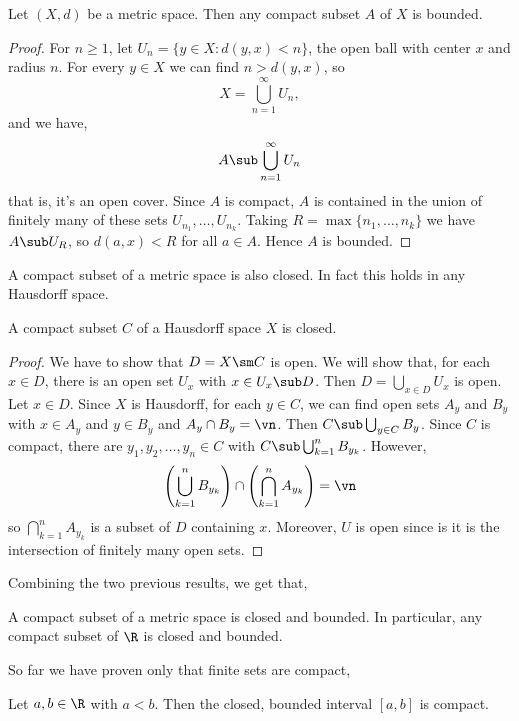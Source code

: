 \begin{nlemma}
  Let $(X, d)$ be a metric space. Then any compact subset $A$ of $X$ is bounded.
\end{nlemma}
\begin{proof}
  For $n \ge 1$, let $U_n = \{y \in X : d(y,x) < n\}$, the open ball with center $x$ and radius $n$. For every $y \in X$ we can find $n > d(y, x)$, so
  $$ X = \bigcup_{n=1}^\infty U_n, $$
  and we have,
  $$ A \sub \bigcup_{n=1}^\infty U_n $$
  that is, it's an open cover. Since $A$ is compact, $A$ is contained in the union of finitely many of these sets $U_{n_1}, \dots, U_{n_k}$. Taking $R = \max\{n_1, \dots, n_k\}$ we have $A \sub U_R$, so $d(a, x) < R$ for all $a \in A$. Hence $A$ is bounded.
\end{proof}

\noindent
A compact subset of a metric space is also closed. In fact this holds in any Hausdorff space.

\begin{nlemma}
  A compact subset $C$ of a Hausdorff space $X$ is closed.
\end{nlemma}
\begin{proof}
  We have to show that $D = X\sm C$ is open. We will show that, for each $x \in D$, there is an open set $U_x$ with $x \in U_x \sub D$. Then $D = \bigcup_{x \in D} U_x$ is open.\\

  \noindent
  Let $x \in D$. Since $X$ is Hausdorff, for each $y \in C$, we can find open sets $A_y$ and $B_y$ with $x \in A_y$ and $y \in B_y$ and $A_y \cap B_y = \vn$. Then $C \sub \bigcup_{y \in C} B_y$. Since $C$ is compact, there are $y_1, y_2, \dots, y_n \in C$ with $C \sub \bigcup_{k=1}^n B_{y_k}$. However,
  $$ \left( \bigcup_{k=1}^n B_{y_k} \right) \cap \left( \bigcap_{k=1}^n A_{y_k} \right) = \vn $$
  so $\bigcap_{k=1}^n A_{y_k}$ is a subset of $D$ containing $x$. Moreover, $U$ is open since is it is the intersection of finitely many open sets.
\end{proof}

\noindent
Combining the two previous results, we get that,
\begin{ncor}
  A compact subset of a metric space is closed and bounded. In particular, any compact subset of $\R$ is closed and bounded.
\end{ncor}

\noindent
So far we have proven only that finite sets are compact,
\begin{nthm}
  Let $a, b \in \R$ with $a < b$. Then the closed, bounded interval $[a, b]$ is compact.\label{thm:HeineBorel}
\end{nthm}

